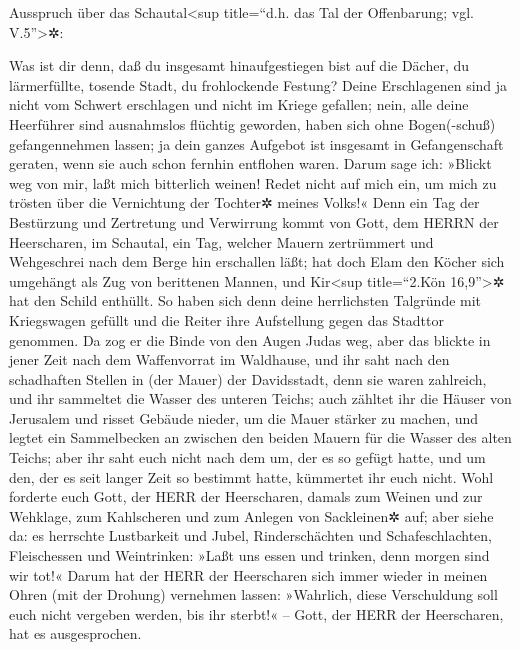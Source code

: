 Ausspruch über das Schautal\textless sup title=``d.h. das
Tal der Offenbarung; vgl. V.5''\textgreater✲:

Was ist dir denn, daß du insgesamt hinaufgestiegen bist auf die Dächer,
du lärmerfüllte, tosende Stadt, du frohlockende Festung?
Deine Erschlagenen sind ja nicht vom Schwert erschlagen und nicht im
Kriege gefallen; nein, alle deine Heerführer sind
ausnahmslos flüchtig geworden, haben sich ohne Bogen(-schuß)
gefangennehmen lassen; ja dein ganzes Aufgebot ist insgesamt in
Gefangenschaft geraten, wenn sie auch schon fernhin entflohen waren.
Darum sage ich: »Blickt weg von mir, laßt mich bitterlich
weinen! Redet nicht auf mich ein, um mich zu trösten über die
Vernichtung der Tochter✲ meines Volks!« Denn ein Tag der
Bestürzung und Zertretung und Verwirrung kommt von Gott, dem HERRN der
Heerscharen, im Schautal, ein Tag, welcher Mauern zertrümmert und
Wehgeschrei nach dem Berge hin erschallen läßt; hat doch
Elam den Köcher sich umgehängt als Zug von berittenen Mannen, und
Kir\textless sup title=``2.Kön 16,9''\textgreater✲ hat den Schild
enthüllt. So haben sich denn deine herrlichsten Talgründe
mit Kriegswagen gefüllt und die Reiter ihre Aufstellung gegen das
Stadttor genommen. Da zog er die Binde von den Augen Judas
weg, aber das blickte in jener Zeit nach dem Waffenvorrat im Waldhause,
und ihr saht nach den schadhaften Stellen in (der Mauer)
der Davidsstadt, denn sie waren zahlreich, und ihr sammeltet die Wasser
des unteren Teichs; auch zähltet ihr die Häuser von
Jerusalem und risset Gebäude nieder, um die Mauer stärker zu machen,
und legtet ein Sammelbecken an zwischen den beiden Mauern
für die Wasser des alten Teichs; aber ihr saht euch nicht nach dem um,
der es so gefügt hatte, und um den, der es seit langer Zeit so bestimmt
hatte, kümmertet ihr euch nicht. Wohl forderte euch Gott,
der HERR der Heerscharen, damals zum Weinen und zur Wehklage, zum
Kahlscheren und zum Anlegen von Sackleinen✲ auf; aber
siehe da: es herrschte Lustbarkeit und Jubel, Rinderschächten und
Schafeschlachten, Fleischessen und Weintrinken: »Laßt uns essen und
trinken, denn morgen sind wir tot!« Darum hat der HERR
der Heerscharen sich immer wieder in meinen Ohren (mit der Drohung)
vernehmen lassen: »Wahrlich, diese Verschuldung soll euch nicht vergeben
werden, bis ihr sterbt!« -- Gott, der HERR der Heerscharen, hat es
ausgesprochen.

